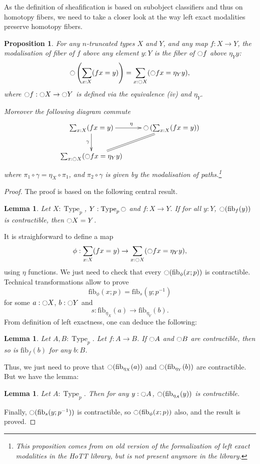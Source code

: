 \documentclass[conference]{IEEEtran}
\newtheorem{prop}[thm]{Proposition}
\newtheorem{lem}[thm]{Lemma}
\newcommand{\mynote}[2]{
    \fbox{\bfseries\sffamily\scriptsize#1}
    {\small$\blacktriangleright$\textsf{\emph{#2}}$\blacktriangleleft$}~}
\newcommand\kq[1]{\mynote{KQ}{#1}}
\newcommand\nt[1]{\mynote{NT}{#1}}
\DeclareMathOperator{\Type}{Type}
\newcommand{\modal}{\ensuremath{\ocircle}}
\newcommand \fib[2] {\mathrm{fib}_{#1}(#2)}
\begin{document}
As the definition of sheafification is based on subobject classifiers
and thus on homotopy fibers, we need to take a closer look at the way left
exact modalities preserve homotopy fibers.
%
\begin{prop}
\label{sec:defin-basic-prop}
For any $n$-truncated types $X$ and $Y$,
and any map $f:X \to Y$, the modalisation of fiber of $f$ above any element $y:Y$
is the fiber of $\modal f$ above $\eta_Y y$:
$$\modal \left(\sum_{x:X}  (f x = y)\right) = \sum_{x:\modal X}
(\modal f x = \eta_Y y),$$
where $\modal f:\modal X \to \modal Y$ is defined via the equivalence {\it (iv)} and $\eta_Y$.

Moreover the following diagram commute
$$\xymatrix{
  \sum_{x:X} (f x = y) \ar[r]^\eta \ar[d]_\gamma & \modal \left(\sum_{x:X}  (f x = y)\right) \ar@{=}[dl]\\
  \sum_{x:\modal X} (\modal f x = \eta_Y y) & }$$
where $\pi_1 \circ \gamma = \eta_X \circ \pi_1$, and
$\pi_2 \circ \gamma$ is given by the modalisation of
paths.\footnote{This proposition comes from on old version of the
  formalization of left exact modalities in the HoTT library, but is
  not present anymore in the library.}
\end{prop}
\begin{proof}

The proof is based on the following central result.
\begin{lem}
  Let $X:\Type_p$, $Y:\Type_p\modal$ and $f:X\to Y$. If for all $y:Y$,
  $\modal (\fib f y)$ is contractible, then $\modal X = Y$.
\end{lem}
%
It is straighforward to define a map
$$\phi:\sum_{x:X}  (f x = y)\to
\sum_{x:\modal X} (\modal f x = \eta_Y y),$$
using $\eta$ functions.
We just need to check that every $\modal(\fib \phi {x;p})$ is
contractible.
Technical transformations allow to prove
$$\fib\phi{x;p} = \fib s {y;p^{-1}}$$
for some $a:\modal X$, $b:\modal Y$ and 
$$s:\fib{\eta_X}a \to \fib{\eta_Y}b.$$
%
From definition of left exactness, one can deduce the following:
\begin{lem}
  Let $A,B:\Type_p$. Let $f:A\to B$. If $\modal A$ and $\modal B$ are
  contractible, then so is $\fib f b$ for any $b:B$.
\end{lem}
Thus, we just need to prove that $\modal(\fib {\eta_X} a)$ and
$\modal(\fib {\eta_Y} b)$ are contractible.
But we have the lemma:
\begin{lem}
  Let $A:\Type_p$. Then for any $y:\modal A$, $\modal(\fib {\eta_A}
  y)$ is contractible.
\end{lem}

Finally, $\modal(\fib s{y;p^{-1}})$ is contractible, so $\modal(\fib \phi {x;p})$ also, and the result is proved.

\end{proof}
\end{document}
